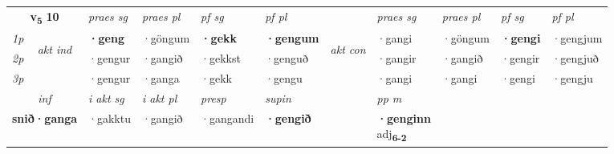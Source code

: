 \noindent
\begin{tabular}{lllllllllll} \toprule
\multicolumn{2}{c}{\textbf{v{\textsubscript{5}}} \Large{\textbf{10}}}  &  \textit{praes sg}  & \textit{praes pl}  &\textit{ pf sg} & \textit{pf pl} &  &  \textit{praes sg}  & \textit{praes pl}  & \textit{pf sg} & \textit{pf pl } \\*
	\cmidrule{3-6} \cmidrule{8-11}
 {\textit{1p}} & \multirow{3}{*}{\begin{turn}{90}\textit{akt ind}\end{turn}} & \textbf{·geng} & ·göngum & \textbf{·gekk} & \textbf{·gengum} & \multirow{3}{*}{\begin{turn}{90}\textit{akt con}\end{turn}} &·gangi & ·göngum & \textbf{·gengi} & ·gengjum\\*
 {\textit{2p}} &  &  ·gengur  & ·gangið & ·gekkst & ·genguð & & ·gangir & ·gangið & ·gengir & ·gengjuð \\*
{\textit{3p}} &  & ·gengur & ·ganga & ·gekk & ·gengu & & ·gangi & ·gangi& ·gengi & ·gengju \\*
\cmidrule{3-6} \cmidrule{8-11}

   \multicolumn{2}{c}{\textit{inf}}  & \textit{i akt sg} & \textit{i akt pl}   & \textit{presp} & \textit{supin}  && \textit{pp m} \\*
  \multicolumn{2}{c}{\textbf{snið\allowbreak ·ganga}} & ·gakktu  & ·gangið   & ·gangandi &  \textbf{·gengið}  && \specialcell{\textbf{·genginn} \\ adj\textbf{\textsubscript{6-2}}} \\*
\end{tabular}

